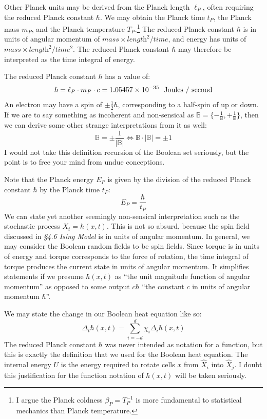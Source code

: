 \documentclass[10pt, a5paper, twoside, openright]{memoir}
\begin{document}
Other Planck units may be derived from the Planck length $\ell_P$, often requiring the reduced Planck constant $\hbar$. We may obtain the Planck time $t_P$, the Planck mass $m_P$, and the Planck temperature $T_P$.\footnote{I argue the Planck coldness $\beta_P = T_P^{-1}$ is more fundamental to statistical mechanics than Planck temperature.} The reduced Planck constant $\hbar$ is in units of angular momentum of $\textit{mass} \times \textit{length}^2 / \textit{time}$, and energy has units of $\textit{mass} \times \textit{length}^2 / \textit{time}^2$. The reduced Planck constant $\hbar$ may therefore be interpreted as the time integral of energy.

The reduced Planck constant $\hbar$ has a value of:
$$\hbar = \ell_P \cdot m_P \cdot c = 1.05457 \times 10^{-35} \ \ \textnormal{Joules / second} $$
An electron may have a spin of $\pm \frac{1}{2} \hbar$, corresponding to a half-spin of up or down. If we are to say something as incoherent and non-sensical as $\mathbb B = \{ -\frac{1}{\mathbb B}, +\frac{1}{\mathbb B}\}$, then we can derive some other strange interpretations from it as well:
$$\mathbb B = \pm \frac{1}{|\mathbb B|} \iff \mathbb B \cdot |\mathbb B| = \pm 1$$
I would not take this definition recursion of the Boolean set seriously, but the point is to free your mind from undue conceptions.

Note that the Planck energy $E_P$ is given by the division of the reduced Planck constant $\hbar$ by the Planck time $t_P$:
$$E_P = \frac{\hbar}{t_P}$$
We can state yet another seemingly non-sensical interpretation such as the stochastic process $X_t = \hbar (x,t)$. This is not so absurd, because the spin field discussed in \textit{\S 4.6 Ising Model} is in units of angular momentum. In general, we may consider the Boolean random fields to be spin fields. Since torque is in units of energy and torque corresponds to the force of rotation, the time integral of torque produces the current state in units of angular momentum. It simplifies statements if we presume $\hbar(x, t)$ as ``the unit magnitude function of angular momentum'' as opposed to some output $c \hbar$ ``the constant $c$ in units of angular momentum $\hbar$''.

We may state the change in our Boolean heat equation like so:
$$\Delta_t \hbar (x, t) = \sum\limits_{i=-d}^d \chi_i \Delta_i \hbar (x,t)$$
The reduced Planck constant $\hbar$ was never intended as notation for a function, but this is exactly the definition that we used for the Boolean heat equation. The internal energy $U$ is the energy required to rotate cells $x$ from $\hat X_i$ into $\hat X_j$. I doubt this justification for the function notation of $\hbar (x,t)$ will be taken seriously.
\end{document}
